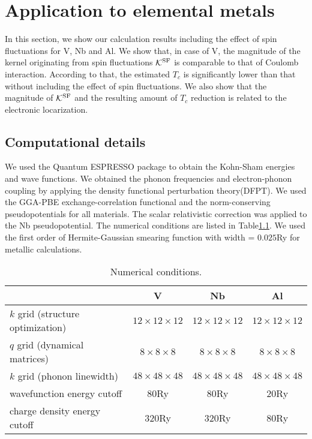 

%
%
\chapter{Application to elemental metals}
\label{application}
In this section, we show our calculation results including the effect of spin fluctuations 
for V, Nb and Al. We show that, in case of V, the magnitude of the kernel originating 
from spin fluctuations $\mathcal K^{\rm SF}$ is comparable to that of Coulomb interaction.
According to that, the estimated $T_{c}$ is significantly lower than that without including the
effect of spin fluctuations. We also show that the magnitude of $\mathcal K^{\rm SF}$ and the 
resulting amount of $T_{c}$ reduction is related to the electronic locarization.

\section{Computational details}
We used the Quantum ESPRESSO\cite{QE} package to obtain the Kohn-Sham energies and wave functions.
We obtained the phonon frequencies and electron-phonon coupling by applying the density functional
perturbation theory(DFPT)\cite{DFPT}.
We used the GGA-PBE exchange-correlation functional\cite{GGAPBE} and the norm-conserving 
pseudopotentials\cite{normcons} for all materials. 
The scalar relativistic correction was applied to the Nb pseudopotential.
The numerical conditions are listed in Table\ref{tab:numcond}.
We used the first order of Hermite-Gaussian smearing function\cite{Paxton1989} 
with width = $0.025$Ry for metallic calculations.

\begin{table}[hbtp]
	\centering
	\caption{Numerical conditions.}
	\begin{tabular}{lccc}
		\hline \hline
		& V & Nb & Al \\
		\hline
	$k$ grid (structure optimization) & $12\times12\times12$ & $12\times12\times12$ & $12\times12\times12$ \\
	$q$ grid (dynamical matrices) & $ 8\times8\times8$ & $8\times8\times8$ & $8\times8\times8$ \\
	$k$ grid (phonon linewidth) & $48\times48\times48$ & $48\times48\times48$ & $48\times48\times48$ \\
	wavefunction energy cutoff & 80Ry & 80Ry & 20Ry \\
	charge density energy cutoff & 320Ry & 320Ry & 80Ry \\
	\hline \hline
	\end{tabular}
	\label{tab:numcond}
\end{table}


